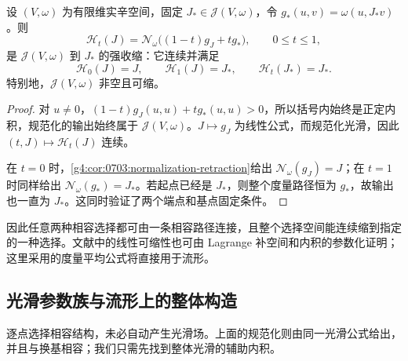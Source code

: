 \begin{theorem}\label{g4:thm:0703:linear-contractibility}
	设 \((V,\omega)\) 为有限维实辛空间，固定 \(J_*\in\mathcal J(V,\omega)\)，令 \(g_*(u,v)=\omega(u,J_*v)\)。则
	\begin{equation}\label{g4:eq:0703:linear-contraction}
		\mathcal H_t(J)
		=\mathcal N_\omega\bigl((1-t)g_J+t g_*\bigr),
		\qquad 0\le t\le1,
	\end{equation}
	是 \(\mathcal J(V,\omega)\) 到 \(J_*\) 的强收缩：它连续并满足
	\[
		\mathcal H_0(J)=J,\qquad
		\mathcal H_1(J)=J_*,\qquad
		\mathcal H_t(J_*)=J_*.
	\]
	特别地，\(\mathcal J(V,\omega)\) 非空且可缩。
\end{theorem}
\begin{proof}
	对 \(u\ne0\)，\((1-t)g_J(u,u)+t g_*(u,u)>0\)，所以括号内始终是正定内积，规范化的输出始终属于 \(\mathcal J(V,\omega)\)。\(J\mapsto g_J\) 为线性公式，而规范化光滑，因此 \((t,J)\mapsto\mathcal H_t(J)\) 连续。

	在 \(t=0\) 时，\cref{g4:cor:0703:normalization-retraction}给出 \(\mathcal N_\omega(g_J)=J\)；在 \(t=1\) 时同样给出 \(\mathcal N_\omega(g_*)=J_*\)。若起点已经是 \(J_*\)，则整个度量路径恒为 \(g_*\)，故输出也一直为 \(J_*\)。这同时验证了两个端点和基点固定条件。
\end{proof}

因此任意两种相容选择都可由一条相容路径连接，且整个选择空间能连续缩到指定的一种选择。文献中的线性可缩性也可由 Lagrange 补空间和内积的参数化证明；这里采用的度量平均公式将直接用于流形。\cite[命题3.2及第3.2节，第110--112页]{Cannas2006Symplectic}

\subsection{光滑参数族与流形上的整体构造}
\label{g4:subsec:0703:04}

逐点选择相容结构，未必自动产生光滑场。上面的规范化则由同一光滑公式给出，并且与换基相容；我们只需先找到整体光滑的辅助内积。

